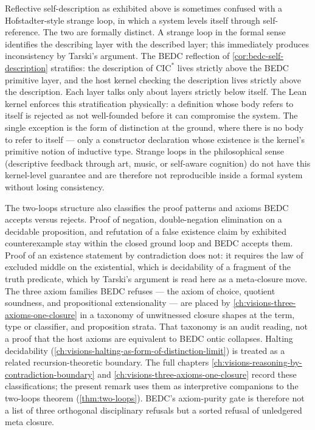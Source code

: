 \begin{remark}
\label{rem:reflection-distinction-from-strange-loop}
Reflective self-description as exhibited above is sometimes confused with a Hofstadter-style strange loop, in which a system levels itself through self-reference. The two are formally distinct. A strange loop in the formal sense identifies the describing layer with the described layer; this immediately produces inconsistency by Tarski's argument. The BEDC reflection of \autoref{cor:bedc-self-description} stratifies: the description of $\mathrm{CIC}^{*}$ lives strictly above the BEDC primitive layer, and the host kernel checking the description lives strictly above the description. Each layer talks only about layers strictly below itself. The Lean kernel enforces this stratification physically: a definition whose body refers to itself is rejected as not well-founded before it can compromise the system. The single exception is the form of distinction at the ground, where there is no body to refer to itself --- only a constructor declaration whose existence is the kernel's primitive notion of inductive type. Strange loops in the philosophical sense (descriptive feedback through art, music, or self-aware cognition) do not have this kernel-level guarantee and are therefore not reproducible inside a formal system without losing consistency.
\end{remark}

\begin{remark}
\label{rem:reasoning-and-axioms-as-meta-closure}
The two-loops structure also classifies the proof patterns and axioms BEDC accepts versus rejects. Proof of negation, double-negation elimination on a decidable proposition, and refutation of a false existence claim by exhibited counterexample stay within the closed ground loop and BEDC accepts them. Proof of an existence statement by contradiction does not: it requires the law of excluded middle on the existential, which is decidability of a fragment of the truth predicate, which by Tarski's argument is read here as a meta-closure move. The three axiom families BEDC refuses --- the axiom of choice, quotient soundness, and propositional extensionality --- are placed by \autoref{ch:visions-three-axioms-one-closure} in a taxonomy of unwitnessed closure shapes at the term, type or classifier, and proposition strata. That taxonomy is an audit reading, not a proof that the host axioms are equivalent to BEDC ontic collapses. Halting decidability (\autoref{ch:visions-halting-as-form-of-distinction-limit}) is treated as a related recursion-theoretic boundary. The full chapters \autoref{ch:visions-reasoning-by-contradiction-boundary} and \autoref{ch:visions-three-axioms-one-closure} record these classifications; the present remark uses them as interpretive companions to the two-loops theorem (\autoref{thm:two-loops}). BEDC's axiom-purity gate is therefore not a list of three orthogonal disciplinary refusals but a sorted refusal of unledgered meta closure.
\end{remark}


